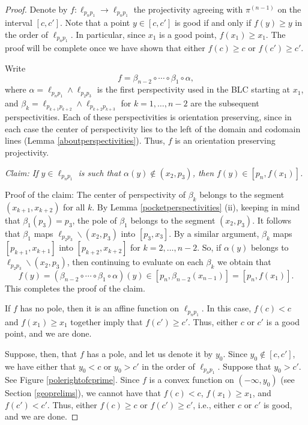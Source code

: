 \documentclass[11pt]{amsart}
\theoremstyle{remark}
\numberwithin{equation}{section}
\renewcommand{\geq}{\geqslant}
\begin{document}
\begin{proof}
Denote by $f\colon \ell_{p_np_1}\to \ell_{p_np_1}$ the projectivity agreeing with  $\pi^{(n-1)}$  on the interval $[c,c']$.
Note that a point $y\in [c,c']$ is good if and only if $f(y)\geq y$ in the order of $\ell_{p_np_1}$. In particular, since $x_1$ is a good point, $f(x_1)\geq x_1$. The proof will be complete once we have shown that either $f(c)\geq c$ or $f(c')\geq c'$.



Write 
\begin{equation*}
f=\beta_{n-2}\circ \cdots \circ\beta_{1}\circ\alpha,
\end{equation*} 
where $\alpha=\ell_{p_np_1}\wedge\ell_{p_2p_3}$ is the first perspectivity used in the BLC starting at $x_1$, and 
$\beta_k=\ell_{p_{k+1}p_{k+2}}\wedge\ell_{p_{k+2}p_{k+3}}$ for $k=1,\ldots,n-2$ are the subsequent perspectivities.  Each of these perspectivities is orientation preserving, since in each case the center of perspectivity lies to the left of the domain and codomain lines (Lemma \ref{aboutperspectivities}). Thus, $f$ is an orientation preserving projectivity.


\emph{Claim: If $y\in  \ell_{p_np_1}$ is such that $\alpha(y)\notin (x_2,p_3)$, then $f(y)\in [p_n,f(x_1)]$.}

Proof of the claim: The center of perspectivity of  $\beta_{k}$ belongs to the segment $(x_{k+1},x_{k+2})$ for all $k$. By  Lemma \ref{pocketperspectivities} (ii), keeping in mind that $\beta_1(p_3)=p_3$, the pole of $\beta_1$ belongs to the segment $(x_2,p_3)$. It follows that $\beta_1$ maps $\ell_{p_2p_3}\backslash (x_2,p_3)$ into $[p_3,x_3]$. By a similar argument, $\beta_{k}$ maps  $[p_{k+1},x_{k+1}]$ into $[p_{k+2},x_{k+2}]$ for $k=2,\ldots, n-2$. So, if  $\alpha(y)$ belongs to $\ell_{p_2p_3}\backslash (x_2,p_3)$,  then continuing to evaluate  on each $\beta_k$ we obtain that
\[
f(y)=(\beta_{n-2}\circ \cdots \circ\beta_{1}\circ\alpha)(y)
\in [p_n,\beta_{n-2}(x_{n-1})]=[p_n,f(x_1)].
\]
This completes the proof of the claim.

If $f$ has no pole, then it is an  affine function on $\ell_{p_np_1}$. In this case, $f(c)<c$ and $f(x_1)\geq x_1$ together  imply that $f(c')\geq c'$. Thus, either $c$ or $c'$ is a good point, and we are done.  

Suppose, then, that $f$ has a pole, and let us denote it by $y_0$. Since $y_0\notin [c,c']$, we have either that $y_0<c$ or $y_0>c'$ in the order of $\ell_{p_np_1}$. Suppose that $y_0> c'$. See Figure \ref{polerightofcprime}. Since  $f$ is a convex function on $(-\infty,y_0)$ (see Section \ref{geoprelims}), we cannot have that $f(c)<c$, $f(x_1)\geq x_1$, and $f(c')<c'$. Thus, either $f(c)\geq c$ or $f(c')\geq c'$, i.e., either $c$ or $c'$ is good, and we are  done. 



\end{proof}
\end{document}
